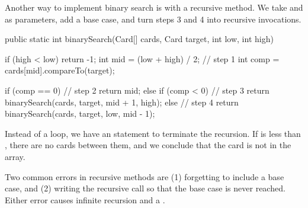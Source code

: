 Another way to implement binary search is with a recursive method.
We take  and  as parameters, add a base case, and turn steps 3 and 4 into recursive invocations.

\begin{code}
public static int binarySearch(Card[] cards, Card target,
                               int low, int high) {
    if (high < low) {
        return -1;
    }
    int mid = (low + high) / 2;                     // step 1
    int comp = cards[mid].compareTo(target);

    if (comp == 0) {                                // step 2
        return mid;
    } else if (comp < 0) {                          // step 3
        return binarySearch(cards, target, mid + 1, high);
    } else {                                        // step 4
        return binarySearch(cards, target, low, mid - 1);
    }
}
\end{code}

Instead of a  loop, we have an  statement to terminate the recursion.
If  is less than , there are no cards between them, and we conclude that the card is not in the array.


Two common errors in recursive methods are (1) forgetting to include a base case, and (2) writing the recursive call so that the base case is never reached.
Either error causes infinite recursion and a .
